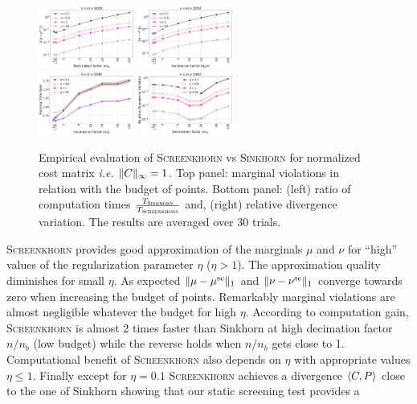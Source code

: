 \begin{figure}[t]
	\begin{center}
		\includegraphics[width=0.28\textwidth]{./figs/norm_M_Mu_marginals_toy_n1000}\hspace{2cm}
		\includegraphics[width=0.28\textwidth]{./figs/norm_M_Nu_marginals_toy_n1000} \\
		\includegraphics[width=0.28\textwidth]{./figs/norm_M_time_toy_n1000}\hspace{2cm}
		\includegraphics[width=0.28\textwidth]{./figs/norm_M_div_toy_n1000}
	\end{center}
	\caption{Empirical evaluation of \textsc{Screenkhorn} vs \textsc{Sinkhorn} for normalized cost matrix \emph{i.e.} $\|C\|_\infty=1$. Top panel: marginal violations in relation with the budget of points. Bottom panel: (left) ratio of computation times    $\frac{T_{\textsc{Sinkhorn}}}{T_{\text{\textsc{Screenkhorn}}}}$ and, (right) relative divergence variation. The results are averaged over $30$ trials.} 
		\label{fig:margin_expe}
\end{figure}
%
\textsc{Screenkhorn} provides good approximation of the marginals $\mu$ and $\nu$ for ``high'' values of the regularization parameter $\eta$ ($\eta > 1$). The approximation quality diminishes for small $\eta$. As expected $\|{\mu} -{\mu}^{\text{sc}}\|_1$ and $\|{\nu} -{\nu}^{\text{sc}}\|_1$ converge towards zero when increasing the budget of points. Remarkably marginal violations are almost negligible whatever the budget for high $\eta$.  According to computation gain, \textsc{Screenkhorn} is almost  2 times faster than Sinkhorn at high decimation factor $n/n_b$ (low budget) while the reverse holds when $n/n_b$ gets close to 1.  Computational benefit of \textsc{Screenkhorn} also depends on $\eta$ with appropriate values $\eta \leq 1$. Finally except for $\eta=0.1$ \textsc{Screenkhorn} achieves a  divergence $\langle C, P \rangle$ close to the one of Sinkhorn showing that our static screening test provides a
